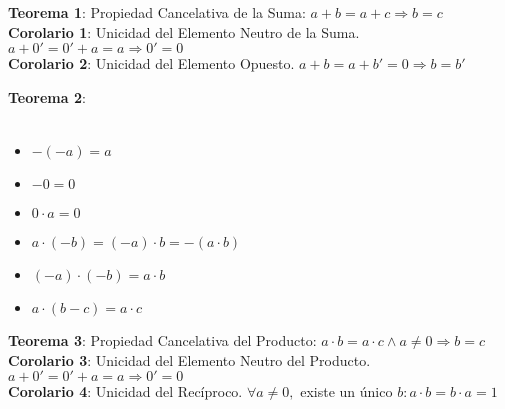 \documentclass[11pt,a4paper]{article}
\begin{document}
\noindent \textbf{Teorema 1}: Propiedad Cancelativa de la Suma: $a+b = a+c \Rightarrow b = c$\\
\noindent \textbf{Corolario 1}: Unicidad del Elemento Neutro de la Suma. $a+0' = 0'+a = a \Rightarrow 0' = 0$\\
\noindent \textbf{Corolario 2}: Unicidad del Elemento Opuesto. $a+b = a+b' = 0 \Rightarrow b=b'$\\
\vspace{-0.9cm}
\begin{multicols}{3}
\noindent \textbf{Teorema 2}:\\ \\

\begin{itemize}
\item $-(-a)=a$
\item $-0 = 0$
\item $0 \cdot a = 0$
\item $a \cdot (-b) = (-a) \cdot b = -(a \cdot b)$
\item $(-a) \cdot (-b) = a \cdot b$
\item $a \cdot (b-c) = a \cdot c$
\end{itemize}
\end{multicols}
\noindent \textbf{Teorema 3}: Propiedad Cancelativa del Producto: $a \cdot b = a \cdot c \land a \not = 0 \Rightarrow b = c$\\
\noindent \textbf{Corolario 3}: Unicidad del Elemento Neutro del Producto. $a+0' = 0'+a = a \Rightarrow 0' = 0$\\
\noindent \textbf{Corolario 4}: Unicidad del Rec\'iproco. $\forall a \not = 0,$ existe un \'unico $b : a\cdot b = b\cdot a = 1$
\vspace{-0.4cm}
\end{document}
